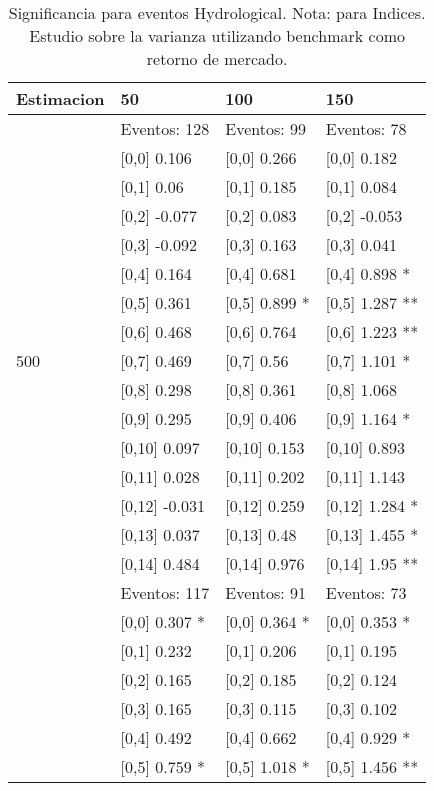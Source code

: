 \begin{table}

\caption{Significancia para eventos Hydrological. Nota: para Indices. Estudio sobre la varianza utilizando benchmark como retorno de mercado.}
\centering
\begin{tabular}[t]{llll}
\toprule
Estimacion & 50 & 100 & 150\\
\midrule
 & Eventos:  128 & Eventos:  99 & Eventos:  78\\
 & {}[0,0] 0.106 & {}[0,0] 0.266 & {}[0,0] 0.182\\
 & {}[0,1] 0.06 & {}[0,1] 0.185 & {}[0,1] 0.084\\
 & {}[0,2] -0.077 & {}[0,2] 0.083 & {}[0,2] -0.053\\
 & {}[0,3] -0.092 & {}[0,3] 0.163 & {}[0,3] 0.041\\
\addlinespace
 & {}[0,4] 0.164 & {}[0,4] 0.681 & {}[0,4] 0.898 *\\
 & {}[0,5] 0.361 & {}[0,5] 0.899 * & {}[0,5] 1.287 **\\
 & {}[0,6] 0.468 & {}[0,6] 0.764 & {}[0,6] 1.223 **\\
500 & {}[0,7] 0.469 & {}[0,7] 0.56 & {}[0,7] 1.101 *\\
 & {}[0,8] 0.298 & {}[0,8] 0.361 & {}[0,8] 1.068\\
\addlinespace
 & {}[0,9] 0.295 & {}[0,9] 0.406 & {}[0,9] 1.164 *\\
 & {}[0,10] 0.097 & {}[0,10] 0.153 & {}[0,10] 0.893\\
 & {}[0,11] 0.028 & {}[0,11] 0.202 & {}[0,11] 1.143\\
 & {}[0,12] -0.031 & {}[0,12] 0.259 & {}[0,12] 1.284 *\\
 & {}[0,13] 0.037 & {}[0,13] 0.48 & {}[0,13] 1.455 *\\
\addlinespace
 & {}[0,14] 0.484 & {}[0,14] 0.976 & {}[0,14] 1.95 **\\
 & Eventos:  117 & Eventos:  91 & Eventos:  73\\
 & {}[0,0] 0.307 * & {}[0,0] 0.364 * & {}[0,0] 0.353 *\\
 & {}[0,1] 0.232 & {}[0,1] 0.206 & {}[0,1] 0.195\\
 & {}[0,2] 0.165 & {}[0,2] 0.185 & {}[0,2] 0.124\\
\addlinespace
 & {}[0,3] 0.165 & {}[0,3] 0.115 & {}[0,3] 0.102\\
 & {}[0,4] 0.492 & {}[0,4] 0.662 & {}[0,4] 0.929 *\\
 & {}[0,5] 0.759 * & {}[0,5] 1.018 * & {}[0,5] 1.456 **\\

\end{tabular}
\end{table}

